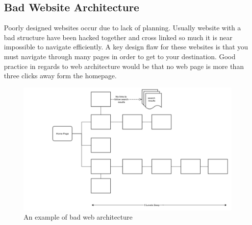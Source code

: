 \documentclass[a4paper, 12pt]{report}
\begin{document}
\subsection{Bad Website Architecture}
Poorly designed websites occur due to lack of planning. Usually website with a bad structure have been hacked together and cross linked so much it is near impossible to navigate efficiently. A key design flaw for these websites is that you must navigate through many pages in order to get to your destination. Good practice in regards to web architecture would be that no web page is more than three clicks away form the homepage.
\begin{figure}[!htbp]
  \centering
    \includegraphics[width=1.0\textwidth]{bad_web_arch.png}
    \caption{An example of bad web architecture}
    \label{fig:bad_web_arch}
\end{figure}\\
\end{document}
